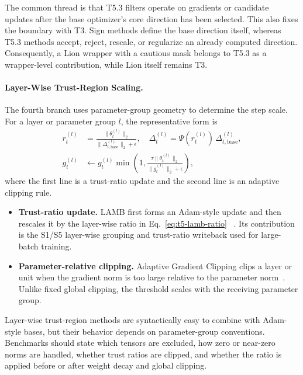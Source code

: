 The common thread is that T5.3 filters operate on gradients or candidate
updates after the base optimizer's core direction has been selected.  This
also fixes the boundary with T3.  Sign methods define the base direction
itself, whereas T5.3 methods accept, reject, rescale, or regularize an already
computed direction.  Consequently, a Lion wrapper with a cautious mask belongs
to T5.3 as a wrapper-level contribution, while Lion itself remains T3.

\paragraph{Layer-Wise Trust-Region Scaling.}
\label{sec:t5-layerwise-trust-region}

The fourth branch uses parameter-group geometry to determine the step scale.
For a layer or parameter group $l$, the representative form is
\begin{align}
  r_t^{(l)}
  &=
  \frac{\|\theta_t^{(l)}\|_2}
       {\|\Delta_{t,\mathrm{base}}^{(l)}\|_2+\epsilon},\quad
  \Delta_t^{(l)}
  =
  \Psi(r_t^{(l)})\,\Delta_{t,\mathrm{base}}^{(l)}, \\
  g_t^{(l)}
  &\leftarrow
  g_t^{(l)}
  \min\!\left(
  1,\frac{\tau\|\theta_t^{(l)}\|_2}{\|g_t^{(l)}\|_2+\epsilon}
  \right),
  \label{eq:t5-layerwise-template}
\end{align}
where the first line is a trust-ratio update and the second line is an
adaptive clipping rule.
\begin{itemize}
  \setlength{\itemsep}{2pt}
  \item \textbf{Trust-ratio update.}  LAMB first forms an Adam-style update and
  then rescales it by the layer-wise ratio in Eq.~\eqref{eq:t5-lamb-ratio}
  ~\citep{you2019large}.  Its contribution is
  the S1/S5 layer-wise grouping and trust-ratio writeback used for large-batch
  training.
  \item \textbf{Parameter-relative clipping.}  Adaptive Gradient Clipping
  clips a layer or unit when the gradient norm is too large relative to the
  parameter norm~\citep{brock2021high}.  Unlike fixed global clipping, the
  threshold scales with the receiving parameter group.
\end{itemize}

Layer-wise trust-region methods are syntactically easy to combine with
Adam-style bases, but their behavior depends on parameter-group conventions.
Benchmarks should state which tensors are excluded, how zero or near-zero
norms are handled, whether trust ratios are clipped, and whether the ratio is
applied before or after weight decay and global clipping.

